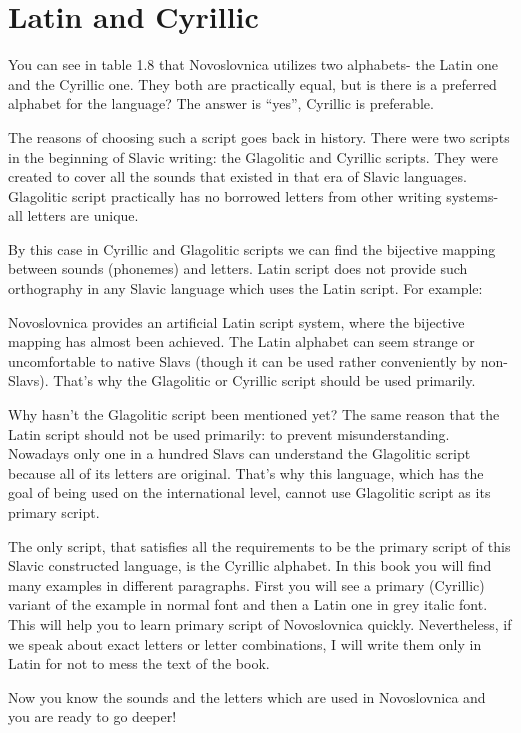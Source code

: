 \section{Latin and Cyrillic}

You can see in table 1.8 that Novoslovnica utilizes two alphabets- the Latin one and the Cyrillic one. They both are practically equal, but is there is a preferred alphabet for the language? The answer is “yes”, Cyrillic is preferable.

The reasons of choosing such a script goes back in history. There were two scripts in the beginning of Slavic writing: the Glagolitic and Cyrillic scripts. They were created to cover all the sounds that existed in that era of Slavic languages. Glagolitic script practically has no borrowed letters from other writing systems- all letters are unique.

By this case in Cyrillic and Glagolitic scripts we can find the bijective mapping between sounds (phonemes) and letters. Latin script does not provide such orthography in any Slavic language which uses the Latin script. For example:

Novoslovnica provides an artificial Latin script system, where the bijective mapping has almost been achieved. The Latin alphabet can seem strange or uncomfortable to native Slavs (though it can be used rather conveniently by non-Slavs). That’s why the Glagolitic or Cyrillic script should be used primarily.

Why hasn’t the Glagolitic script been mentioned yet? The same reason that the Latin script should not be used primarily: to prevent misunderstanding. Nowadays only one in a hundred Slavs can understand the Glagolitic script because all of its letters are original. That’s why this language, which has the goal of being used on the international level, cannot use Glagolitic script as its primary script.

The only script, that satisfies all the requirements to be the primary script of this Slavic constructed language, is the Cyrillic alphabet. In this book you will find many examples in different paragraphs. First you will see a primary (Cyrillic) variant of the example in normal font and then a Latin one in grey italic font. This will help you to learn primary script of Novoslovnica quickly. Nevertheless, if we speak about exact letters or letter combinations, I will write them only in Latin for not to mess the text of the book.

Now you know the sounds and the letters which are used in Novoslovnica and you are ready to go deeper!
